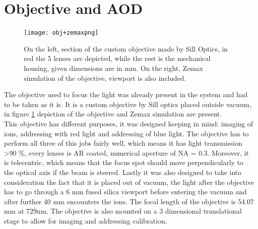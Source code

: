 \section{Objective and AOD}
\label{sec:obj}
%
\begin{figure}[H]
      \centering
          \centering
          \texttt{[image: obj+zemaxpng]}
           \caption{On the left, section of the custom objective made by Sill Optics, in red the 5 lenses are depicted, while the rest is the mechanical housing, given dimensions are in mm. On the right, Zemax simulation of the objective, viewport is also included.}
          \label{objsection}
\end{figure}
The objective used to focus the light was already present in the system and had to be taken as it is. It is a custom objective by Sill optics placed outside vacuum, in figure \ref{objsection} depiction of the objective and Zemax simulation are present.\\
This objective has different purposes, it was designed keeping in mind: imaging of ions, addressing with red light and addressing of blue light. The objective has to perform all three of this jobs fairly well, which means it has light transmission >90 \%, every lenses is AR coated, numerical aperture of NA = 0.3. Moreover, it is telecentric, which means that the focus spot should move perpendicularly to the optical axis if the beam is steered.
 Lastly it was also designed to take into consideration the fact that it is placed out of vacuum, the light after the objective has to go through a 6 mm fused silica viewport before entering the vacuum and after further 40 mm encounters the ions. The focal length of the objective is 54.07 mm at 729nm. The objective is also mounted on a 3 dimensional translational stage to allow for imaging and addressing calibration.\\
